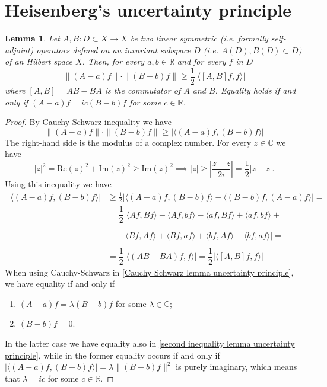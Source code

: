 \documentclass[corpo=11pt, stile=classica, tipotesi=custom,
greek, evenboxes, english]{toptesi}
\numberwithin{equation}{chapter}
\newtheorem{lem}[teo]{Lemma}
\theoremstyle{remark}
\newcommand{\R}{\mathbb{R}} %
\newcommand{\C}{\mathbb{C}} %
\begin{document}
\section{Heisenberg's uncertainty principle}\label{section Heisenberg's UP}
{\color{red}\begin{lem}\label{uncertainty principle for operators lemma}
	Let $A,B: D \subset X \rightarrow X$ be two linear symmetric (i.e. formally self-adjoint) operators defined on an invariant subspace $D$ (i.e. $A(D),B(D) \subset D$) of an Hilbert space $X$. Then, for every $a,b \in \R$ and for every $f$ in $D$
	\begin{equation}\label{uncertainty principle for operators formula}
		\| (A-a)f \| \cdot \| (B-b) f\| \geq \dfrac12\lvert\langle [A,B]f,f \rangle \rvert
	\end{equation}
	where $[A,B] = AB-BA$ is the commutator of $A$ and $B$. Equality holds if and only if $(A-a)f = i c(B-b)f$ for some $c \in \R$.
\end{lem}}
\begin{proof}
	By Cauchy-Schwarz inequality we have
	\begin{equation}\label{Cauchy Schwarz lemma uncertainty principle}
		\| (A-a)f \| \cdot \| (B-b) f\| \geq |\langle (A-a)f, (B-b)f \rangle|
	\end{equation}
	The right-hand side is the modulus of a complex number. For every $z \in \C$ we have
	\begin{equation*}
		|z|^2 = \mathrm{Re}(z)^2 + \mathrm{Im}(z)^2 \geq \mathrm{Im}(z)^2 \implies |z| \geq \left| \dfrac{z-\overline{z}}{2i}\right| = \dfrac{1}{2} |z-\overline{z}|.
	\end{equation*}
	Using this inequality we have
	\begin{align}
		|\langle (A-a)f, (B-b)f \rangle| &\geq \frac{1}{2}\left| \langle (A-a)f, (B-b)f \rangle - \langle (B-b)f, (A-a)f \rangle \right| = \label{second inequality lemma uncertainty principle}\\
										 &=\dfrac{1}{2}| \langle Af,Bf \rangle - \langle Af,bf \rangle - \langle af,Bf \rangle + \langle af,bf \rangle +\nonumber\\
										 &\phantom{\dfrac{1}{2}|} - \langle Bf,Af \rangle + \langle Bf,af \rangle + \langle bf,Af \rangle - \langle bf,af \rangle | =\nonumber\\
										 &=\dfrac{1}{2}|\langle (AB - BA)f,f \rangle| = \dfrac{1}{2}|\langle [A,B]f,f \rangle| \nonumber
	\end{align}
	When using Cauchy-Schwarz in \eqref{Cauchy Schwarz lemma uncertainty principle}, we have equality if and only if
	\begin{enumerate}[label=(\roman*)]
		\item $(A-a)f = \lambda (B-b)f$ for some $\lambda \in \C$;
		\item $(B-b)f=0$.
	\end{enumerate}
	In the latter case we have equality also in \eqref{second inequality lemma uncertainty principle}, while in the former equality occurs if and only if $|\langle (A-a)f,(B-b)f\rangle| = \lambda \|(B-b)f\|^2$ is purely imaginary, which means that $\lambda = ic$ for some $c \in \R$.
\end{proof}
\end{document}
